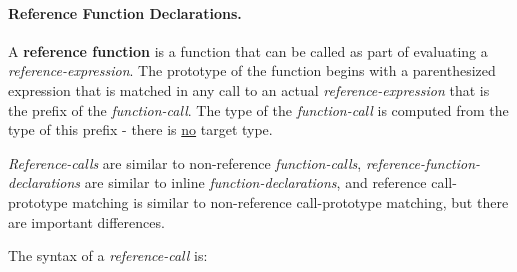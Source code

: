 \documentclass[12pt]{article}
\newcommand{\subsubsubsection}[1]{\paragraph[#1]{#1.}}
\newcommand{\key}[1]{{\rm \bfseries #1}}
\begin{document}
\subsubsubsection{Reference Function Declarations}
\label{REFERENCE-FUNCTION-DECLARATIONS}

A \key{reference function} is a function that can be
called as part of evaluating a {\em reference-expression}.
The prototype of the function begins with
a parenthesized expression that is matched in
any call to an actual {\em reference-expression} that is
the prefix of the {\em function-call}.  The type of
the {\em function-call} is computed from the type of
this prefix - there is \underline{no} target type.

{\em Reference-calls} are similar to non-reference {\em function-calls},
{\em reference-function-declarations} are similar to
inline {\em function-declarations}, and reference call-prototype
matching is similar to non-reference call-prototype matching,
but there are important differences.

The syntax of a {\em reference-call} is:
\end{document}

